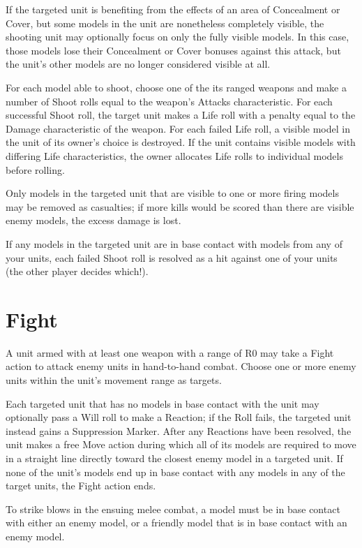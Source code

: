 \begin{multicols}{2}
If the targeted unit is benefiting from the effects of an area of Concealment or Cover, but some models in the unit are nonetheless completely visible, the shooting unit may optionally focus on only the fully visible models. In this case, those models lose their Concealment or Cover bonuses against this attack, but the unit's other models are no longer considered visible at all.

For each model able to shoot, choose one of the its ranged weapons and make a number of Shoot rolls equal to the weapon's Attacks characteristic. For each successful Shoot roll, the target unit makes a Life roll with a penalty equal to the Damage characteristic of the weapon. For each failed Life roll, a visible model in the unit of its owner's choice is destroyed. If the unit contains visible models with differing Life characteristics, the owner allocates Life rolls to individual models before rolling.

Only models in the targeted unit that are visible to one or more firing models may be removed as casualties; if more kills would be scored than there are visible enemy models, the excess damage is lost.

If any models in the targeted unit are in base contact with models from any of your units, each failed Shoot roll is resolved as a hit against one of your units (the other player decides which!).




\section*{Fight}
A unit armed with at least one weapon with a range of R0 may take a Fight action to attack enemy units in hand-to-hand combat. Choose one or more enemy units within the unit's movement range as targets.

Each targeted unit that has no models in base contact with the unit may optionally pass a Will roll to make a Reaction; if the Roll fails, the targeted unit instead gains a Suppression Marker. After any Reactions have been resolved, the unit makes a free Move action during which all of its models are required to move in a straight line directly toward the closest enemy model in a targeted unit. If none of the unit's models end up in base contact with any models in any of the target units, the Fight action ends.

To strike blows in the ensuing melee combat, a model must be in base contact with either an enemy model, or a friendly model that is in base contact with an enemy model.


\end{multicols}
